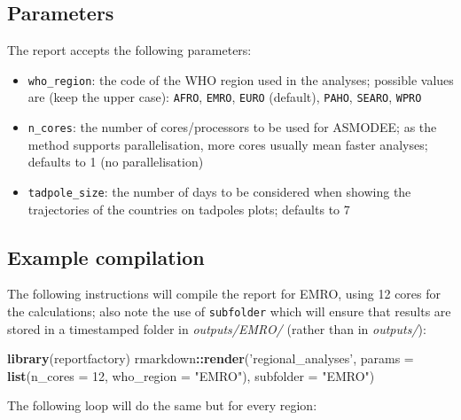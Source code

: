 \documentclass[]{book}
\newenvironment{Shaded}{\begin{snugshade}}{\end{snugshade}}
\newcommand{\DataTypeTok}[1]{\textcolor[rgb]{0.13,0.29,0.53}{#1}}
\newcommand{\DecValTok}[1]{\textcolor[rgb]{0.00,0.00,0.81}{#1}}
\newcommand{\KeywordTok}[1]{\textcolor[rgb]{0.13,0.29,0.53}{\textbf{#1}}}
\newcommand{\NormalTok}[1]{#1}
\newcommand{\OperatorTok}[1]{\textcolor[rgb]{0.81,0.36,0.00}{\textbf{#1}}}
\newcommand{\StringTok}[1]{\textcolor[rgb]{0.31,0.60,0.02}{#1}}
\begin{document}
\hypertarget{parameters-1}{%
\subsection{Parameters}\label{parameters-1}}

The report accepts the following parameters:

\begin{itemize}
\item
  \texttt{who\_region}: the code of the WHO region used in the analyses; possible values
  are (keep the upper case): \texttt{AFRO}, \texttt{EMRO}, \texttt{EURO} (default), \texttt{PAHO}, \texttt{SEARO},
  \texttt{WPRO}
\item
  \texttt{n\_cores}: the number of cores/processors to be used for ASMODEE; as the
  method supports parallelisation, more cores usually mean faster analyses;
  defaults to 1 (no parallelisation)
\item
  \texttt{tadpole\_size}: the number of days to be considered when showing the
  trajectories of the countries on tadpoles plots; defaults to 7
\end{itemize}

\hypertarget{example-compilation-1}{%
\subsection{Example compilation}\label{example-compilation-1}}

The following instructions will compile the report for EMRO, using 12 cores for
the calculations; also note the use of \texttt{subfolder} which will ensure that
results are stored in a timestamped folder in \emph{outputs/EMRO/} (rather than in
\emph{outputs/}):

\begin{Shaded}
\begin{Highlighting}[]

\KeywordTok{library}\NormalTok{(reportfactory)}
\NormalTok{rmarkdown}\OperatorTok{::}\KeywordTok{render}\NormalTok{(}\StringTok{'regional_analyses'}\NormalTok{,}
                  \DataTypeTok{params =} \KeywordTok{list}\NormalTok{(}\DataTypeTok{n_cores =} \DecValTok{12}\NormalTok{, }\DataTypeTok{who_region =} \StringTok{"EMRO"}\NormalTok{),}
                  \DataTypeTok{subfolder =} \StringTok{"EMRO"}\NormalTok{)}
\end{Highlighting}
\end{Shaded}

The following loop will do the same but for every region:
\end{document}
